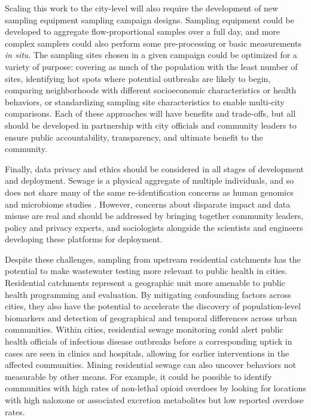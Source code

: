 Scaling this work to the city-level will also require the development of new sampling equipment sampling campaign designs. Sampling equipment could be developed to aggregate flow-proportional samples over a full day, and more complex samplers could also perform some pre-processing or basic measurements \textit{in situ}. The sampling sites chosen in a given campaign could be optimized for a variety of purpose: covering as much of the population with the least number of sites, identifying hot spots where potential outbreaks are likely to begin, comparing neighborhoods with different socioeconomic characteristics or health behaviors, or standardizing sampling site characteristics to enable multi-city comparisons. Each of these approaches will have benefits and trade-offs, but all should be developed in partnership with city officials and community leaders to ensure public accountability, transparency, and ultimate benefit to the community.

Finally, data privacy and ethics should be considered in all stages of development and deployment. Sewage is a physical aggregate of multiple individuals, and so does not share many of the same re-identification concerns as human genomics and microbiome studies \cite{Franzosa2015}. However, concerns about disparate impact and data misuse are real and should be addressed by bringing together community leaders, policy and privacy experts, and sociologists alongside the scientists and engineers developing these platforms for deployment.

Despite these challenges, sampling from upstream residential catchments has the potential to make wastewater testing more relevant to public health in cities. Residential catchments represent a geographic unit more amenable to public health programming and evaluation. By mitigating confounding factors across cities, they also have the potential to accelerate the discovery of population-level biomarkers and detection of geographical and temporal differences across urban communities. Within cities, residential sewage monitoring could alert public health officials of infectious disease outbreaks before a corresponding uptick in cases are seen in clinics and hospitals, allowing for earlier interventions in the affected communities. Mining residential sewage can also uncover behaviors not measurable by other means. For example, it could be possible to identify communities with high rates of non-lethal opioid overdoes by looking for locations with high naloxone or associated excretion metabolites but low reported overdose rates.

